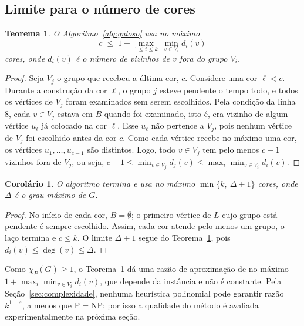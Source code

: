 \documentclass[12pt]{article}
\newtheorem{teorema}{Teorema}
\newtheorem{corolario}{Corolário}
\newcommand{\chiP}{\chi_P}
\begin{document}
\subsection{Limite para o número de cores}

\begin{teorema}\label{teo:limite}
  O Algoritmo~\ref{alg:guloso} usa no máximo
  \[
    c \;\le\; 1+\max_{1\le i\le k}\ \min_{v\in V_i} d_i(v)
  \]
  cores, onde $d_i(v)$ é o número de vizinhos de $v$ fora do grupo $V_i$.
\end{teorema}

\begin{proof}
  Seja $V_j$ o grupo que recebeu a última cor, $c$. Considere uma cor
  $\ell<c$. Durante a construção da cor $\ell$, o grupo $j$ esteve pendente o
  tempo todo, e todos os vértices de $V_j$ foram examinados sem serem
  escolhidos. Pela condição da linha 8, cada $v\in V_j$ estava em $B$ quando
  foi examinado, isto é, era vizinho de algum vértice $u_\ell$ já colocado na
  cor $\ell$. Esse $u_\ell$ não pertence a $V_j$, pois nenhum vértice de $V_j$
  foi escolhido antes da cor $c$. Como cada vértice recebe no máximo uma cor,
  os vértices $u_1,\dots,u_{c-1}$ são distintos. Logo, todo $v\in V_j$ tem pelo
  menos $c-1$ vizinhos fora de $V_j$, ou seja,
  $c-1\le \min_{v\in V_j} d_j(v)\le \max_i \min_{v\in V_i} d_i(v)$.
\end{proof}

\begin{corolario}\label{cor:k}
  O algoritmo termina e usa no máximo $\min\{k,\ \Delta+1\}$ cores, onde
  $\Delta$ é o grau máximo de $G$.
\end{corolario}

\begin{proof}
  No início de cada cor, $B=\emptyset$; o primeiro vértice de $L$ cujo grupo
  está pendente é sempre escolhido. Assim, cada cor atende pelo menos um grupo,
  o laço termina e $c\le k$. O limite $\Delta+1$ segue do
  Teorema~\ref{teo:limite}, pois $d_i(v)\le\deg(v)\le\Delta$.
\end{proof}

Como $\chiP(G)\ge 1$, o Teorema~\ref{teo:limite} dá uma razão de aproximação
de no máximo $1+\max_i\min_{v\in V_i} d_i(v)$, que depende da instância e não é
constante. Pela Seção~\ref{sec:complexidade}, nenhuma heurística polinomial
pode garantir razão $k^{1-\varepsilon}$, a menos que P${}={}$NP; por isso a
qualidade do método é avaliada experimentalmente na próxima seção.

\end{document}
